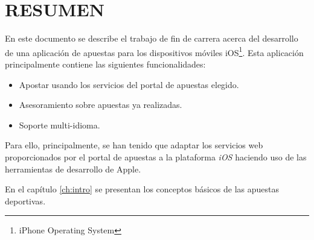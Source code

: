 \chapter*{RESUMEN}

En este documento se describe el trabajo de fin de carrera acerca del desarrollo de una aplicación de apuestas para los dispositivos móviles iOS\footnote{iPhone Operating System}. Esta aplicación principalmente contiene las siguientes funcionalidades:
\begin{itemize}
    \item Apostar usando los servicios del portal de apuestas elegido.
    \item Asesoramiento sobre apuestas ya realizadas.
    \item Soporte multi-idioma.
  \end{itemize}
       
      Para ello, principalmente, se han tenido que adaptar los servicios web proporcionados por el portal de apuestas a la plataforma \emph{iOS} haciendo uso de las herramientas de desarrollo de Apple.
       
     En el capítulo \ref{ch:intro} se presentan los conceptos básicos
    de las apuestas deportivas.

